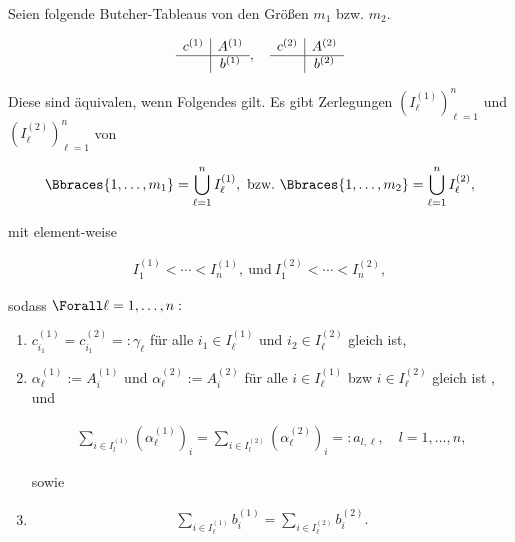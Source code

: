 \begin{proposition*}

Seien folgende Butcher-Tableaus von den Größen $m_1$ bzw. $m_2$.

\begin{align*}
  \begin{array}{c|c}
    c^{(1)} & A^{(1)} \\
    \hline
            & b^{(1)}
  \end{array},
  \quad
  \begin{array}{c|c}
    c^{(2)} & A^{(2)} \\
    \hline
            & b^{(2)}
  \end{array}
\end{align*}

Diese sind äquivalen, wenn Folgendes gilt.
Es gibt Zerlegungen $(I_\ell^{(1)})_{\ell = 1}^n$ und $(I_\ell^{(2)})_{\ell = 1}^n$ von

\begin{align*}
  \Bbraces{1, \ldots, m_1}
  =
  \bigcup_{\ell = 1}^n I_\ell^{(1)},
  ~\text{bzw.}~
  \Bbraces{1, \ldots, m_2}
  =
  \bigcup_{\ell = 1}^n I_\ell^{(2)},
\end{align*}

mit element-weise

\begin{align*}
  I_1^{(1)}
  <
  \cdots
  <
  I_n^{(1)},
  ~\text{und}~
  I_1^{(2)}
  <
  \cdots
  <
  I_n^{(2)},
\end{align*}

sodass $\Forall \ell = 1, \ldots, n:$

\begin{enumerate}

  \item
  $c_{i_1}^{(1)} = c_{i_1}^{(2)} =: \gamma_\ell$
  für alle
  $i_1 \in I_\ell^{(1)}$ und $i_2 \in I_\ell^{(2)}$
  gleich ist,

  \item
  $\alpha_\ell^{(1)} := A_i^{(1)}$
  und
  $\alpha_\ell^{(2)} := A_i^{(2)}$
  für alle
  $i \in I_\ell^{(1)}$ bzw $i \in I_\ell^{(2)}$
  gleich ist \footnotemark, und


  \begin{align*}
    \sum_{i \in I_l^{(1)}}
    (\alpha_\ell^{(1)})_i
    =
    \sum_{i \in I_l^{(2)}}
    (\alpha_\ell^{(2)})_i
    =:
    a_{l, \ell},
    \quad
    l = 1, \ldots, n,
  \end{align*}

  sowie

  \item
  \begin{align*}
    \sum_{i \in I_\ell^{(1)}}
    b_i^{(1)}
    =
    \sum_{i \in I_\ell^{(2)}}
    b_i^{(2)}.
  \end{align*}

\end{enumerate}

\end{proposition*}

